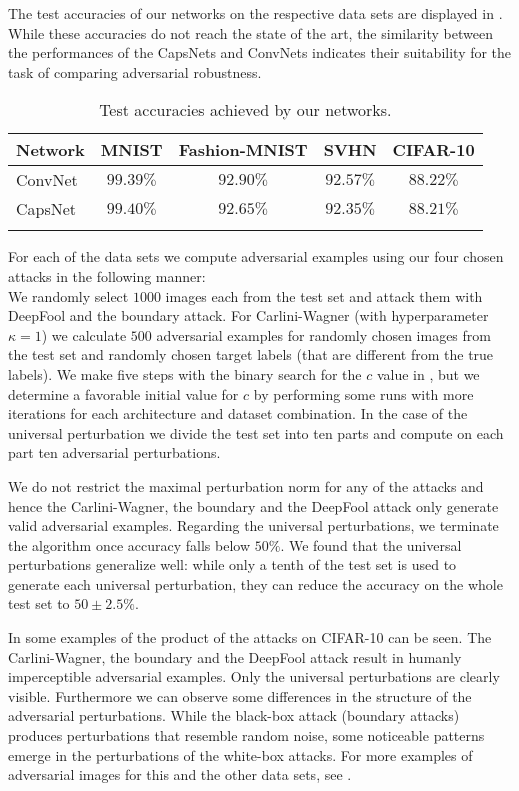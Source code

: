 The test accuracies of our networks on the respective data sets are displayed in .
While these accuracies do not reach the state of the art, the similarity between the performances of the CapsNets and ConvNets indicates their suitability for the task of comparing adversarial robustness.

\begin{table}	
	\centering
	\begin{tabular}{lcccc}
		\toprule
		Network       & MNIST & Fashion-MNIST & SVHN & CIFAR-10  \\
		\midrule
		ConvNet           & $99.39\%$ & $92.90\%$ & $92.57\%$ & $88.22\%$ \\
		CapsNet           & $99.40\%$ & $92.65\%$ & $92.35\%$ & $88.21\%$ \\
		\bottomrule\\
	\end{tabular}
	\caption{Test accuracies achieved by our networks.}
	\label{tab:accuracies}
\end{table}

For each of the data sets we compute adversarial examples using our four chosen attacks in the following manner:\\
We randomly select $1000$ images each from the test set and attack them with DeepFool and the boundary attack.
For Carlini-Wagner (with hyperparameter $\kappa=1$) we calculate $500$ adversarial examples for randomly chosen images from the test set and randomly chosen target labels (that are different from the true labels).
We make five steps with the binary search for the $c$ value in , but we determine a favorable initial value for $c$ by performing some runs with more iterations for each architecture and dataset combination.
In the case of the universal perturbation we divide the test set into ten parts and compute on each part ten adversarial perturbations.

We do not restrict the maximal perturbation norm for any of the attacks and hence the Carlini-Wagner, the boundary and the DeepFool attack only generate valid adversarial examples.
Regarding the universal perturbations, we terminate the algorithm once accuracy falls below $50\%$.
We found that the universal perturbations generalize well: while only a tenth of the test set is used to generate each universal perturbation, they can reduce the accuracy on the whole test set to $50\pm2.5\%$.

In  some examples of the product of the attacks on CIFAR-10 can be seen.
The Carlini-Wagner, the boundary and the DeepFool attack result in humanly imperceptible adversarial examples.
Only the universal perturbations are clearly visible.
Furthermore we can observe some differences in the structure of the adversarial perturbations.
While the black-box attack (boundary attacks) produces perturbations that resemble random noise, some noticeable patterns emerge in the perturbations of the white-box attacks.
For more examples of adversarial images for this and the other data sets, see .


